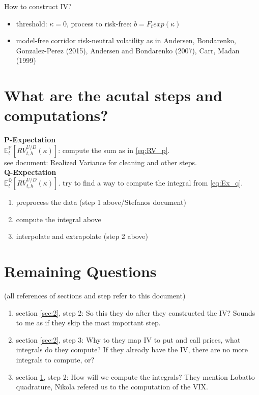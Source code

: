 \documentclass{article}
\begin{document}
How to construct IV?
\begin{itemize}
\item threshold: $\kappa = 0$, process to risk-free: $b = F_{t}exp(\kappa)$
\item model-free corridor risk-neutral volatility as in Andersen, Bondarenko, Gonzalez-Perez (2015), Andersen and Bondarenko (2007), Carr, Madan (1999)
\end{itemize}


\section{What are the acutal steps and computations?}\label{sec:3}

\textbf{P-Expectation}\\

$\mathbb{E}_{t}^{\mathbb{P}} \left[ RV_{t,h}^{U/D} (\kappa) \right] $: compute the sum as in \ref{eq:RV_p}.\\

see document: Realized Variance for cleaning and other steps.\\

\textbf{Q-Expectation}\\

$\mathbb{E}_{t}^{\mathbb{Q}} \left[ RV_{t,h}^{U/D} (\kappa) \right]$. try to find a way to compute the integral from \ref{eq:Ex_q}.\\

\begin{enumerate}
\item preprocess the data (step 1 above/Stefanos document)
\item compute the integral above
\item interpolate and extrapolate (step 2 above)

\end{enumerate}

\section{Remaining Questions}
(all references of sections and step refer to this document)
\begin{enumerate}
\item section \ref{sec:2}, step 2: So this they do after they constructed the IV? Sounds to me as if they skip the most important step.
\item section \ref{sec:2}, step 3: Why to they map IV to put and call prices, what integrals do they compute? If they already have the IV, there are no more integrals to compute, or?
\item section \ref{sec:3}, step 2: How will we compute the integrals? They mention Lobatto quadrature, Nikola refered us to the computation of the VIX.
\end{enumerate}
\end{document}
